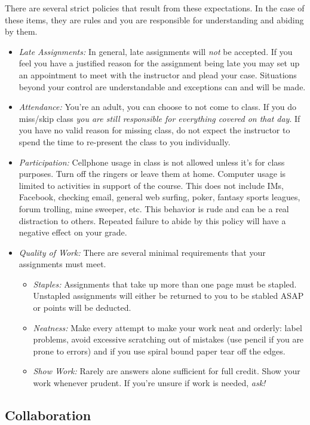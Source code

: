 \documentclass[nobib]{tufte-handout}
\begin{document}
There are several strict policies that result from these expectations.  In the case of these items, they are rules and you are responsible for understanding and abiding by them.
\begin{itemize}
\item \textit{Late Assignments: }In general, late assignments will \textit{not} be accepted.  If you feel you have a justified reason for the assignment being late you may set up an appointment to meet with the instructor and plead your case.  Situations beyond your control are understandable and exceptions can and will be made.
\item \textit{Attendance: }You're an adult, you can choose to not come to class.  If you do miss/skip class \textit{you are still responsible for everything covered on that day}.  If you have no valid reason for missing class, do not expect the instructor to spend the time to re-present the class to you individually.
\item \textit{Participation: }  Cellphone usage in class is not allowed unless it's for class purposes. Turn off the ringers or leave them at home.  Computer usage is limited to activities in support of the course.  This does not include IMs, Facebook, checking email, general web surfing, poker, fantasy sports leagues, forum trolling, mine sweeper, etc.  This behavior is rude and can be a real distraction to others.  Repeated failure to abide by this policy will have a negative effect on your grade.
\item \textit{Quality of Work:} There are several minimal requirements that your assignments must meet.
\begin{itemize}
\item \textit{Staples: } Assignments that take up more than one page must be stapled.  Unstapled assignments will either be returned to you to be stabled ASAP or points will be deducted.
\item \textit{Neatness: }  Make every attempt to make your work neat and orderly:  label problems, avoid excessive scratching out of mistakes (use pencil if you are prone to errors) and if you use spiral bound paper tear off the edges.
\item \textit{Show Work: } Rarely are answers alone sufficient for full credit.  Show your work whenever prudent.  If you're unsure if work is needed, \textit{ask!}
\end{itemize}
\end{itemize}

\subsection{Collaboration}
\end{document}
